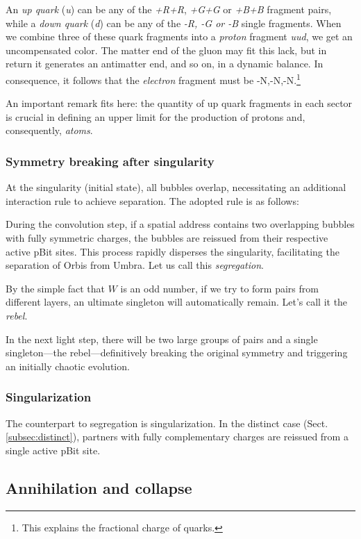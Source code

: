 \documentclass[12pt]{article}
\begin{document}
An \emph{up quark} (\emph{u}) can be any of the \emph{+R+R}, \emph{+G+G} or \emph{+B+B} fragment pairs, while a \emph{down quark} (\emph{d}) can be any of the \emph{-R, -G or -B }single fragments. When we combine three of these quark fragments into a \emph{proton} fragment \emph{uud}, we get an uncompensated color. The matter end of the gluon may fit this lack, but in return it generates an antimatter end, and so on, in a dynamic balance. In consequence, it follows that the \emph{electron} fragment must be -N,-N,-N.\footnote{This explains the fractional charge of quarks.} 

An important remark fits here: the quantity of up quark fragments in each sector is crucial in defining an upper limit for the production of protons and, consequently, \textit{atoms}.

\subsubsection{Symmetry breaking after singularity}

At the singularity (initial state), all bubbles overlap, necessitating an additional interaction rule to achieve separation. The adopted rule is as follows:

During the convolution step, if a spatial address contains two overlapping bubbles with fully symmetric charges, the bubbles are reissued from their respective active pBit sites. This process rapidly disperses the singularity, facilitating the separation of Orbis from Umbra. Let us call this \textit{segregation}.

By the simple fact that $W  $ is an odd number, if we try to form pairs from different layers, an ultimate singleton will automatically remain. Let's call it the \textit{rebel}.

In the next light step, there will be two large groups of pairs and a single singleton—the rebel—definitively breaking the original symmetry and triggering an initially chaotic evolution.

\subsubsection{Singularization}
The counterpart to segregation is singularization. In the distinct case (Sect. \ref{subsec:distinct}), partners with fully complementary charges are reissued from a single active pBit site.

\subsection{Annihilation and collapse}
\end{document}

